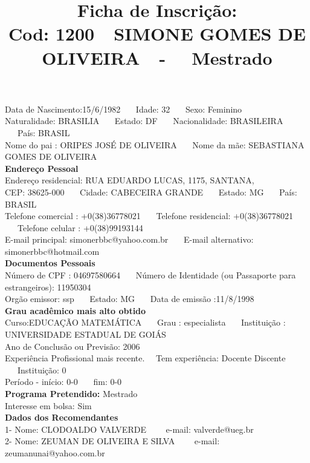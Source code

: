 \documentclass[11pt]{article}
\title{\vspace*{-4cm} Ficha de Inscrição: \\Cod: 1200\ \ SIMONE GOMES DE OLIVEIRA\ \ - \ \ Mestrado 
 }
\date{}
\begin{document}
\maketitle
\vspace*{-1.5cm}
\noindent Data de Nascimento:15/6/1982
\ \ \ Idade: 32   \ \ \ Sexo: Feminino
\\
Naturalidade: BRASILIA  
\ \ \  Estado: DF
\ \ \  Nacionalidade: BRASILEIRA
\ \ \ País: BRASIL
\\        
Nome do pai : ORIPES JOSÉ DE OLIVEIRA
\ \ \ Nome da mãe: SEBASTIANA GOMES DE OLIVEIRA          
\\[0.2cm]                     
\textbf{Endereço Pessoal} 
\\ 
\noindent Endereço residencial: RUA EDUARDO LUCAS, 1175,  SANTANA, 
\\
        CEP: 38625-000 
\ \ \ Cidade: CABECEIRA GRANDE 
\ \ \ Estado: MG 
\ \ \ País: BRASIL
\\		
		Telefone comercial : +0(38)36778021
\ \ \ Telefone residencial: +0(38)36778021
\ \ \ Telefone celular : +0(38)99193144
\\
E-mail principal: simonerbbc@yahoo.com.br
\ \ \ E-mail alternativo: simonerbbc@hotmail.com 
\\[0.2cm] 
\textbf{Documentos Pessoais}
\\
\noindent Número de CPF : 04697580664
\ \ \ Número de Identidade (ou Passaporte para estrangeiros): 11950304
\\
Orgão emissor: ssp
\ \ \ Estado: MG
\ \ \ Data de emissão :11/8/1998
\\[0.3cm]
\textbf{Grau acadêmico mais alto obtido}
\\	
Curso:EDUCAÇÃO MATEMÁTICA
\ \ \ Grau : especialista
\ \ \ Instituição : UNIVERSIDADE ESTADUAL DE GOIÁS
\\			
Ano de Conclusão ou Previsão: 2006
\\ 
Experiência Profissional mais recente. \ \  
Tem experiência: Docente Discente  
\ \ \ Instituição: 0
\\  
Período - início: 0-0
\ \ \ fim: 0-0
\\[0.2cm] 
\textbf{Programa Pretendido:} Mestrado\\
Interesse em bolsa: Sim
\\[0.3cm]		
\textbf{Dados dos Recomendantes} 
\\
1- Nome: CLODOALDO VALVERDE
\ \ \ \  e-mail: valverde@ueg.br 
\\
2- Nome: ZEUMAN DE OLIVEIRA E SILVA
\ \ \ \ e-mail: zeumanunai@yahoo.com.br
\\
\end{document}
